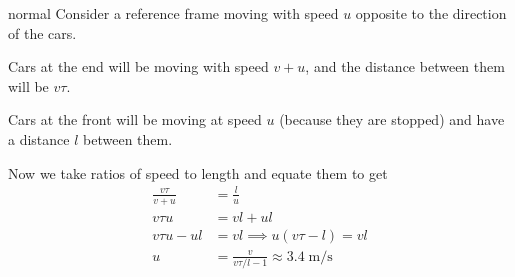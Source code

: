 \begin{solution}{normal}
Consider a reference frame moving with speed $u$ opposite to the direction of the cars. \vspace{3mm}

Cars at the end will be moving with speed $v+u$, and the distance between them will be $v\tau$.\vspace{3mm}

Cars at the front will be moving at speed $u$ (because they are stopped) and have a distance $l$ between them.\vspace{3mm}

Now we take ratios of speed to length and equate them to get
\begin{align*}
\frac{v\tau}{v+u} &= \frac{l}{u}\\
v\tau u &= vl + ul \\
v\tau u - ul &= vl \implies u(v\tau - l) = vl\\
u &= \boxed{\frac{v}{v\tau/l -1}\approx 3.4\;\text{m/s}}
\end{align*}

\end{solution}